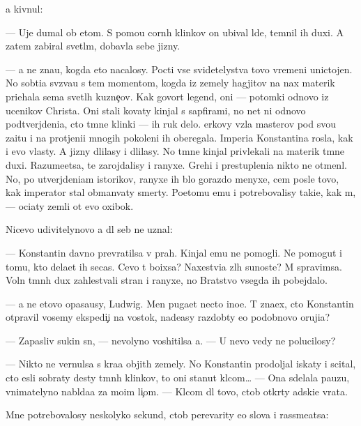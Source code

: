 \documentclass[10pt]{book}
\begin{document}
{\Y}a kivnul:

— Uje dumal ob etom. S pomo{\x}{\y}u corn{\yi}h klinkov on ubival l{\iu}de{\y}, temnil ih duxi. A zatem zabiral svetl{\yi}m, dobavl{\ia}{\y}a sebe jizny.

— {\Y}a ne zna{\y}u, kogda eto nacalosy. Pocti vse svidetelystva tovo vremeni unictojen{\yi}. No sob{\yi}ti{\y}a sv{\ia}z{\yi}va{\y}u s tem momentom, kogda iz zemely hagjitov na nax materik pri{\y}ehala sem{\y}a svetl{\yi}h kuzne{\c}ov. Kak govor{\ia}t legend{\yi}, oni — potomki odnovo iz ucenikov Christa. Oni stali kovaty kinjal{\yi} s sapfirami, no net ni odnovo podtverjdeni{\y}a, cto t{\e}mn{\yi}{\y}e klinki — ih ruk delo. {\C}erkovy vz{\ia}la masterov pod svo{\y}u za{\x}itu i na prot{\ia}jeni{\y}i mnogih pokoleni{\y} ih oberegala. Imperi{\y}a Konstantina rosla, kak i {\y}evo vlasty. A jizny dlilasy i dlilasy. No t{\e}mn{\yi}{\y}e kinjal{\yi} privlekali na materik t{\e}mn{\yi}{\y}e duxi. Razume{\y}etsa, te zarojdalisy i ranyxe. Grehi i prestupleni{\y}a nikto ne otmen{\ia}l. No, po utverjdeni{\y}am istorikov, ranyxe ih b{\yi}lo gorazdo menyxe, cem posle tovo, kak imperator stal obman{\yi}vaty smerty. Poetomu {\y}emu i potrebovalisy taki{\y}e, kak m{\yi}, — oci{\x}aty zemli ot {\y}evo oxibok.

Nicevo udivitelynovo {\y}a dl{\ia} seb{\ia} ne uznal:

— Konstantin davno prevratilsa v prah. Kinjal{\yi} {\y}emu ne pomogli. Ne pomogut i tomu, kto dela{\y}et ih se{\y}cas. Cevo t{\yi} bo{\y}ixsa? Naxestvi{\y}a zl{\yi}h su{\x}noste{\y}? M{\yi} spravimsa. Voln{\yi} t{\e}mn{\yi}h dux zahlest{\yi}vali stran{\yi} i ranyxe, no Bratstvo vsegda ih pobejdalo.

— {\Y}a ne etovo opasa{\y}usy, Ludwig. Men{\ia} puga{\y}et necto ino{\y}e. T{\yi} zna{\y}ex, cto Konstantin otpravil vosemy ekspedi{\c}i{\y} na vostok, nade{\y}asy razdob{\yi}ty {\y}e{\x}o podobnovo oruji{\y}a?

— Zapasliv{\yi}{\y} sukin s{\yi}n, — nevolyno voshitilsa {\y}a. — U nevo vedy ne polucilosy?

— Nikto ne vernulsa s kra{\y}a objit{\yi}h zemely. No Konstantin prodoljal iskaty i scital, cto {\y}esli sobraty des{\ia}ty t{\e}mn{\yi}h klinkov, to oni stanut kl{\iu}com… — Ona sdelala pauzu, vnimatelyno nabl{\iu}da{\y}a za mo{\y}im li{\c}om. — Kl{\iu}com dl{\ia} tovo, ctob{\yi} otkr{\yi}ty adski{\y}e vrata.

Mne potrebovalosy neskolyko sekund, ctob{\yi} perevarity {\y}e{\y}o slova i rassme{\y}atsa:
\end{document}
